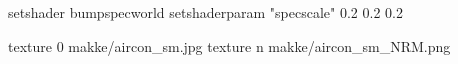 setshader bumpspecworld
setshaderparam "specscale" 0.2 0.2 0.2

texture 0 makke/aircon_sm.jpg
texture n makke/aircon_sm_NRM.png
